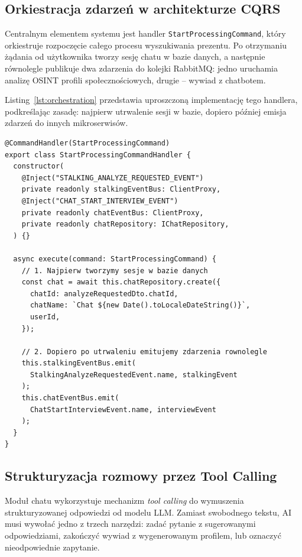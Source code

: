 \documentclass[12pt,a4paper]{article}
\begin{document}
\subsection{Orkiestracja zdarzeń w architekturze CQRS}
Centralnym elementem systemu jest handler \texttt{StartProcessingCommand}, który orkiestruje rozpoczęcie całego procesu wyszukiwania prezentu. Po otrzymaniu żądania od użytkownika tworzy sesję chatu w bazie danych, a następnie równolegle publikuje dwa zdarzenia do kolejki RabbitMQ: jedno uruchamia analizę OSINT profili społecznościowych, drugie – wywiad z chatbotem.

Listing~\ref{lst:orchestration} przedstawia uproszczoną implementację tego handlera, podkreślając zasadę: najpierw utrwalenie sesji w bazie, dopiero później emisja zdarzeń do innych mikroserwisów.

\begin{lstlisting}[caption={Orkiestracja zdarzeń przy rozpoczęciu wyszukiwania prezentu},label={lst:orchestration}]
@CommandHandler(StartProcessingCommand)
export class StartProcessingCommandHandler {
  constructor(
    @Inject("STALKING_ANALYZE_REQUESTED_EVENT")
    private readonly stalkingEventBus: ClientProxy,
    @Inject("CHAT_START_INTERVIEW_EVENT")
    private readonly chatEventBus: ClientProxy,
    private readonly chatRepository: IChatRepository,
  ) {}

  async execute(command: StartProcessingCommand) {
    // 1. Najpierw tworzymy sesje w bazie danych
    const chat = await this.chatRepository.create({
      chatId: analyzeRequestedDto.chatId,
      chatName: `Chat ${new Date().toLocaleDateString()}`,
      userId,
    });

    // 2. Dopiero po utrwaleniu emitujemy zdarzenia rownolegle
    this.stalkingEventBus.emit(
      StalkingAnalyzeRequestedEvent.name, stalkingEvent
    );
    this.chatEventBus.emit(
      ChatStartInterviewEvent.name, interviewEvent
    );
  }
}
\end{lstlisting}

\subsection{Strukturyzacja rozmowy przez Tool Calling}
Moduł chatu wykorzystuje mechanizm \textit{tool calling} do wymuszenia strukturyzowanej odpowiedzi od modelu LLM. Zamiast swobodnego tekstu, AI musi wywołać jedno z trzech narzędzi: zadać pytanie z sugerowanymi odpowiedziami, zakończyć wywiad z wygenerowanym profilem, lub oznaczyć nieodpowiednie zapytanie.
\end{document}
